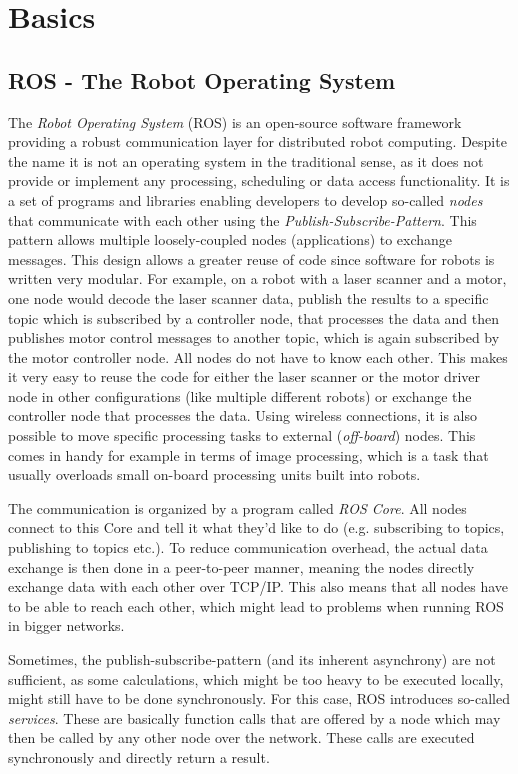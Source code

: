 \chapter{Basics}
\label{chap:basics}
\section{ROS - The Robot Operating System}

The \textit{Robot Operating System} (ROS) is an open-source software framework providing a robust communication layer for distributed robot computing\cite{ros:intro}. Despite the name it is not an operating system in the traditional sense, as it does not provide or implement any processing, scheduling or data access functionality. It is a set of programs and libraries enabling developers to develop so-called \textit{nodes} that communicate with each other using the \textit{Publish-Subscribe-Pattern}.
This pattern allows multiple loosely-coupled nodes (applications) to exchange messages. This design allows a greater reuse of code since software for robots is written very modular\cite{Eugster2003}. For example, on a robot with a laser scanner and a motor, one node would decode the laser scanner data, publish the results to a specific topic which is subscribed by a controller node, that processes the data and then publishes motor control messages to another topic, which is again subscribed by the motor controller node. All nodes do not have to know each other. This makes it very easy to reuse the code for either the laser scanner or the motor driver node in other configurations (like multiple different robots) or exchange the controller node that processes the data. Using wireless connections, it is also possible to move specific processing tasks to external (\textit{off-board}) nodes. This comes in handy for example in terms of image processing, which is a task that usually overloads small on-board processing units built into robots.

The communication is organized by a program called \textit{ROS Core}. All nodes connect to this Core and tell it what they'd like to do (e.g. subscribing to topics, publishing to topics etc.). To reduce communication overhead, the actual data exchange is then done in a peer-to-peer manner, meaning the nodes directly exchange data with each other over TCP/IP. This also means that all nodes have to be able to reach each other, which might lead to problems when running ROS in bigger networks.

Sometimes, the publish-subscribe-pattern (and its inherent asynchrony) are not sufficient, as some calculations, which might be too heavy to be executed locally, might still have to be done synchronously. For this case, ROS introduces so-called \textit{services}. These are basically function calls that are offered by a node which may then be called by any other node over the network. These calls are executed synchronously and directly return a result.

